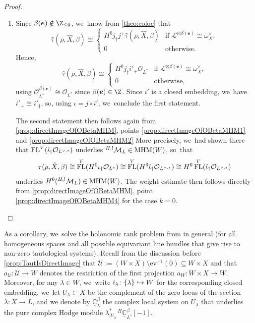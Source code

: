 \documentclass[JEP,XML,SOM,Unicode,published]{cedram}
\let\mathds\mathbb
\newcommand\hto{\mathrel{\lhook\joinrel\to}}
\newcommand{\bme}{{\boldsymbol{e}}}
\newcommand{\ev}{\mathrm{ev}}
\newcommand{\dC}{{\mathds C}}\let\C\dC
\newcommand{\Ell}{\mathscr{L}}
\newcommand{\cM}{\mathcal{M}}
\newcommand{\cO}{\mathcal{O}}\let\O\cO
\newcommand{\cU}{\mathcal{U}}\let\mcu\cU
\DeclareMathOperator{\FL}{\textup{FL}}
\newcommand{\MHM}{\textup{MHM}}
\begin{document}
\begin{proof}
\begin{enumerate}
\item Since $\beta(\bme) \notin \Z_{\leq 0}$, we~know from \cref{theo:coloc} that
\[
\hat\tau(\rho, \hat X, \beta) \cong 
\begin{cases} H^0 j_\dag j^+ \hat\tau(\rho, \hat X, \beta) &\text{if } \Ell^{\otimes \beta(\bme)} \cong \omega_X^\vee, \\
0 & \text{otherwise.}
\end{cases}
\]
Hence,
\[
\hat\tau(\rho, \hat X, \beta) \cong 
\begin{cases} H^0 j_\dag i'_+ \O_{L^*} &\text{if } \Ell^{\otimes \beta(\bme)} \cong \omega_X^\vee, \\
0 & \text{otherwise,}
\end{cases}
\]
using $\O_{L^*}^{\beta(\bme)} \cong \O_{L^*}$ since $\beta(\bme) \in \Z$. Since $i'$ is a closed embedding, we~have $i'_+ \cong i'_\dag$, so, using $\iota = j \circ i'$, we~conclude the first statement.

The second statement then follows again from \cref{prop:directImageOfOBetaMHM}, points \eqref{prop:directImageOfOBetaMHM1} and \eqref{prop:directImageOfOBetaMHM2} More precisely, we~had shown there that $\FL^V(\hat{\iota}_\dag \cO_{L^{\vee,*}})$ underlies ${^{H,!}}\cM_L\in\MHM(W)$, so~that
\[
\tau(\rho,\hat{X},\beta)
\cong
\FL^V(H^0 \iota_\dag \cO_{L^*})
\cong
\FL^V(H^0 \hat{\iota}_\dag \cO_{L^{\vee,*}})
\cong
H^0\FL^V(\hat{\iota}_\dag \cO_{L^{\vee,*}})
\]
underlies $H^0({^{H,!}}\cM_L)\in\MHM(W)$. The weight estimate then follows directly from \cref{prop:directImageOfOBetaMHM}, point \eqref{prop:directImageOfOBetaMHM4} for the case $k=0$. \qedhere
\end{enumerate}
\end{proof}

As a corollary, we~solve the holonomic rank problem from \cite[Conj.\,1.3.]{Bloch_HolRankProb} in general (\ie for all homogeneous spaces and all possible equivariant line bundles that give rise to non-zero tautological systems). Recall from the discussion before \cref{prop:TautIsDirectImage} that $\cU:=(W\times X) \setminus \ev^{-1}(0) \subseteq W\times X$ and that $a_\cU\colon \cU\to W$ denotes the restriction of the first projection $a_W \colon W\times X\to W$.
Moreover, for any $\lambda\in W$, we~write $i_\lambda \colon \{\lambda\}\hto W$ for the corresponding closed embedding, we~let $U_\lambda\subset X$ be the complement of the zero locus of the section $\lambda \colon X\to L$, and we denote by $\underline{\dC}^\beta_\lambda$ the complex local system on $U_\lambda$ that underlies the pure complex Hodge module $\lambda^*_{|U_\lambda}\, ^{H\!}\underline{\dC}^\beta_{L^*}[-1]$.
\end{document}
